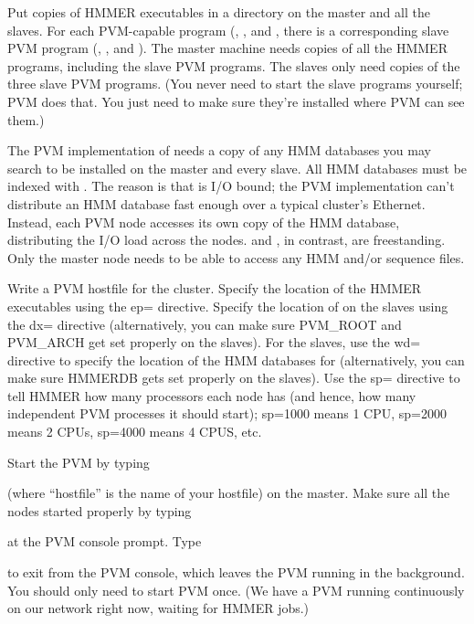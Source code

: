 Put copies of HMMER executables in a directory on the master and all
the slaves. For each PVM-capable program (,
, and , there is a corresponding slave
PVM program (, , and
). The master machine needs copies of all the HMMER
programs, including the slave PVM programs.  The slaves only need
copies of the three slave PVM programs. (You never need to start the
slave programs yourself; PVM does that. You just need to make sure
they're installed where PVM can see them.)

The PVM implementation of  needs a copy of any HMM
databases you may search to be installed on the master and every
slave. All HMM databases must be indexed with . The
reason is that  is I/O bound; the PVM implementation
can't distribute an HMM database fast enough over a typical cluster's
Ethernet. Instead, each PVM node accesses its own copy of the HMM
database, distributing the I/O load across the nodes.
 and , in contrast, are
freestanding. Only the master node needs to be able to access any HMM
and/or sequence files.

Write a PVM hostfile for the cluster. Specify the location of the
HMMER executables using the ep= directive. Specify the location of
 on the slaves using the dx= directive (alternatively, you
can make sure PVM\_ROOT and PVM\_ARCH get set properly on the
slaves). For the slaves, use the wd= directive to specify the location
of the HMM databases for  (alternatively, you can make
sure HMMERDB gets set properly on the slaves). Use the sp= directive
to tell HMMER how many processors each node has (and hence, how many
independent PVM processes it should start); sp=1000 means 1 CPU,
sp=2000 means 2 CPUs, sp=4000 means 4 CPUS, etc.

Start the PVM by typing


(where ``hostfile'' is the name of your hostfile) on the master. Make
sure all the nodes started properly by typing 


at the PVM
console prompt.  Type 


to exit from the PVM console, which leaves the PVM running in the
background.  You should only need to start PVM once. (We have a PVM
running continuously on our network right now, waiting for HMMER
jobs.)

